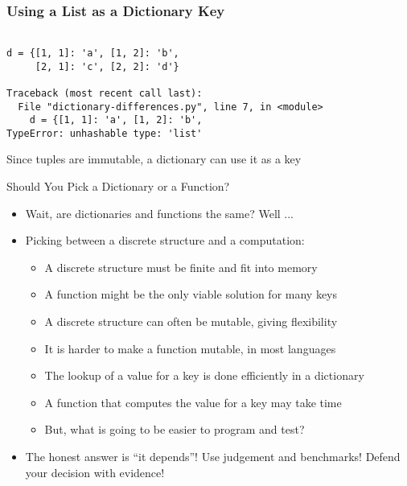 \documentclass[14pt,aspectratio=169]{beamer}
\begin{document}
%
\begin{frame}[fragile]
  \frametitle{Using a List as a Dictionary Key}
  \begin{minipage}{6in}
    \vspace*{.25in}
    \begin{verbatim}

d = {[1, 1]: 'a', [1, 2]: 'b',
     [2, 1]: 'c', [2, 2]: 'd'}

Traceback (most recent call last):
  File "dictionary-differences.py", line 7, in <module>
    d = {[1, 1]: 'a', [1, 2]: 'b',
TypeError: unhashable type: 'list'

    \end{verbatim}
  \end{minipage}
  \vspace*{.025in}
  \begin{center}
    \normalsize \noindent Since tuples are immutable, a dictionary can use it as
    a key\\
  \end{center}
\end{frame}

%
\begin{frame}{Should You Pick a Dictionary or a Function?}
  \begin{itemize}
    \item Wait, are dictionaries and functions the same? Well ...
      \vspace*{-.15in}
    \item Picking between a discrete structure and a computation:
      \begin{itemize}
        \item A discrete structure must be finite and fit into memory
        \item A function might be the only viable solution for many keys
        \item A discrete structure can often be mutable, giving flexibility
        \item It is harder to make a function mutable, in most languages
        \item The lookup of a value for a key is done efficiently in a
          dictionary
        \item A function that computes the value for a key may take time
        \item But, what is going to be easier to program and test?
      \end{itemize}
      \vspace*{-.2in}
    \item The honest answer is ``it depends''! Use judgement and benchmarks!
      Defend your decision with evidence!
  \end{itemize}
\end{frame}
\end{document}
